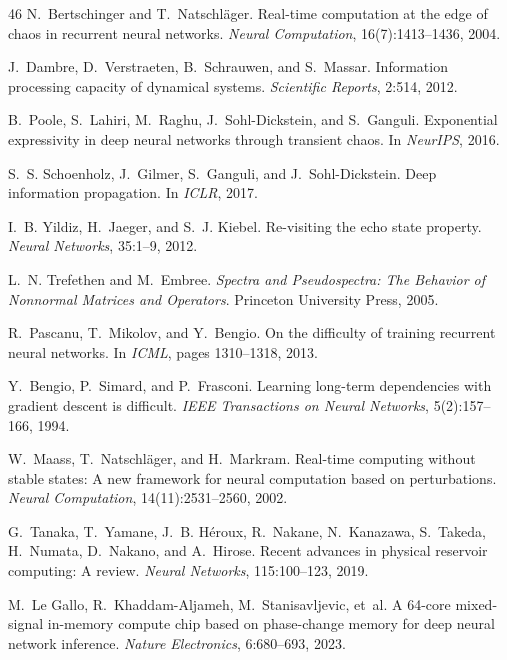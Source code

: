 \documentclass{article}
\theoremstyle{remark}
\begin{document}
\begin{thebibliography}{46}
N.~Bertschinger and T.~Natschl{\"a}ger.
\newblock Real-time computation at the edge of chaos in recurrent neural
  networks.
\newblock \emph{Neural Computation}, 16(7):1413--1436, 2004.

J.~Dambre, D.~Verstraeten, B.~Schrauwen, and S.~Massar.
\newblock Information processing capacity of dynamical systems.
\newblock \emph{Scientific Reports}, 2:514, 2012.

B.~Poole, S.~Lahiri, M.~Raghu, J.~Sohl-Dickstein, and S.~Ganguli.
\newblock Exponential expressivity in deep neural networks through transient
  chaos.
\newblock In \emph{NeurIPS}, 2016.

S.~S. Schoenholz, J.~Gilmer, S.~Ganguli, and J.~Sohl-Dickstein.
\newblock Deep information propagation.
\newblock In \emph{ICLR}, 2017.

I.~B. Yildiz, H.~Jaeger, and S.~J. Kiebel.
\newblock Re-visiting the echo state property.
\newblock \emph{Neural Networks}, 35:1--9, 2012.

L.~N. Trefethen and M.~Embree.
\newblock \emph{Spectra and Pseudospectra: The Behavior of Nonnormal Matrices
  and Operators}.
\newblock Princeton University Press, 2005.

R.~Pascanu, T.~Mikolov, and Y.~Bengio.
\newblock On the difficulty of training recurrent neural networks.
\newblock In \emph{ICML}, pages 1310--1318, 2013.

Y.~Bengio, P.~Simard, and P.~Frasconi.
\newblock Learning long-term dependencies with gradient descent is difficult.
\newblock \emph{IEEE Transactions on Neural Networks}, 5(2):157--166, 1994.

W.~Maass, T.~Natschl{\"a}ger, and H.~Markram.
\newblock Real-time computing without stable states: A new framework for
  neural computation based on perturbations.
\newblock \emph{Neural Computation}, 14(11):2531--2560, 2002.

G.~Tanaka, T.~Yamane, J.~B. H{\'e}roux, R.~Nakane, N.~Kanazawa, S.~Takeda,
  H.~Numata, D.~Nakano, and A.~Hirose.
\newblock Recent advances in physical reservoir computing: A review.
\newblock \emph{Neural Networks}, 115:100--123, 2019.

M.~Le Gallo, R.~Khaddam-Aljameh, M.~Stanisavljevic, et~al.
\newblock A 64-core mixed-signal in-memory compute chip based on phase-change
  memory for deep neural network inference.
\newblock \emph{Nature Electronics}, 6:680--693, 2023.


\end{thebibliography}
\end{document}

